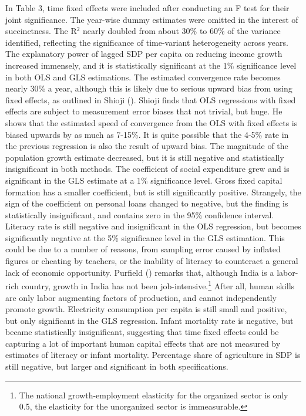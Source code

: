 \documentclass[a4paper, 11pt]{article}
\begin{document}
In Table 3, time fixed effects were included after conducting an F test for their joint significance.  The year-wise dummy estimates were omitted in the interest of succinctness.  The R$^{2}$ nearly doubled from about 30\% to 60\% of the variance identified, reflecting the significance of time-variant heterogeneity across years.  The explanatory power of lagged SDP per capita on reducing income growth increased immensely, and it is statistically significant at the 1\% significance level in both OLS and GLS estimations.  The estimated convergence rate becomes nearly 30\% a year, although this is likely due to serious upward bias from using fixed effects, as outlined in Shioji (\citeyear{shioji1997convergence}).  Shioji finds that OLS regressions with fixed effects are subject to measurement error biases that not trivial, but huge.  He shows that the estimated speed of convergence from the OLS with fixed effects is biased upwards by as much as 7-15\%.  It is quite possible that the 4-5\% rate in the previous regression is also the result of upward bias.  The magnitude of the population growth estimate decreased, but it is still negative and statistically insignificant in both methods.  The coefficient of social expenditure grew and is significant in the GLS estimate at a 1\% significance level.  Gross fixed capital formation has a smaller coefficient, but is still significantly positive.  Strangely, the sign of the coefficient on personal loans changed to negative, but the finding is statistically insignificant, and contains zero in the 95\% confidence interval.  Literacy rate is still negative and insignificant in the OLS regression, but becomes significantly negative at the 5\% significance level in the GLS estimation.  This could be due to a number of reasons, from sampling error caused by inflated figures or cheating by teachers, or the inability of literacy to counteract a general lack of economic opportunity.  Purfield (\citeyear{purfield_mind_2006}) remarks that, although India is a labor-rich country, growth in India has not been job-intensive.\footnote{The national growth-employment elasticity for the organized sector is only 0.5, the elasticity for the unorganized sector is immeasurable.}  After all, human skills are only labor augmenting factors of production, and cannot independently promote growth.  Electricity consumption per capita is still small and positive, but only significant in the GLS regression.  Infant mortality rate is negative, but became statistically insignificant, suggesting that time fixed effects could be capturing a lot of important human capital effects that are not measured by estimates of literacy or infant mortality.  Percentage share of agriculture in SDP is still negative, but larger and significant in both specifications.  \par
\end{document}

